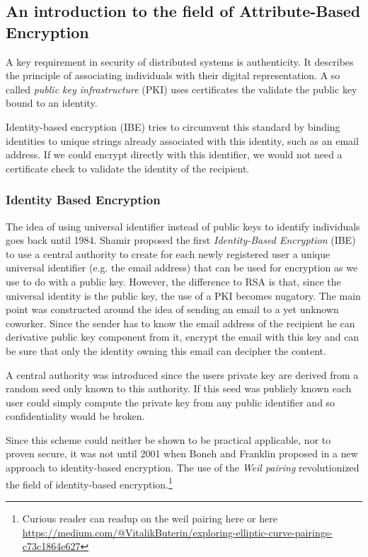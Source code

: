 \subsection{An introduction to the field of Attribute-Based Encryption}
A key requirement in security of distributed systems is authenticity. It describes the principle of associating individuals with their digital representation. A so called \textit{public key infrastructure} (\ac{PKI}) uses certificates the validate the public key bound to an identity.

Identity-based encryption (\ac{IBE}) tries to circumvent this standard by binding identities to unique strings already associated with this identity, such as an email address. If we could encrypt directly with this identifier, we would not need a certificate check to validate the identity of the recipient. 

\subsubsection{Identity Based Encryption}
The idea of using universal identifier instead of public keys to identify individuals goes back until 1984. Shamir proposed the first \textit{Identity-Based Encryption} (\ac{IBE}) \cite{shamir1984identity} to use a central authority to create for each newly registered user a unique universal identifier (e.g. the email address) that can be used for encryption as we use to do with a public key. However, the difference to \ac{RSA} is that, since the universal identity is the public key, the use of a \ac{PKI} becomes nugatory. The main point was constructed around the idea of sending an email to a yet unknown coworker. Since the sender has to know the email address of the recipient he can derivative public key component from it, encrypt the email with this key and can be sure that only the identity owning this email can decipher the content. 

A central authority was introduced since the users private key are derived from a random seed only known to this authority. If this seed was publicly known each user could simply compute the private key from any public identifier and so confidentiality would be broken. 

Since this scheme could neither be shown to be practical applicable, nor to proven secure, it was not until 2001 when Boneh and Franklin proposed in \cite{boneh2001identity} a new approach to identity-based encryption. The use of the \textit{Weil pairing} revolutionized the field of identity-based encryption.\footnote{Curious reader can readup on the weil pairing here \cite{Miller2004} \cite{galbraith2008pairings} or here \url{https://medium.com/@VitalikButerin/exploring-elliptic-curve-pairings-c73c1864e627}}

